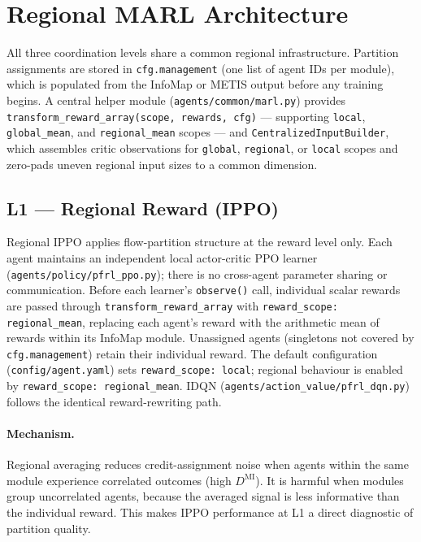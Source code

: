 \documentclass{article}
\begin{document}
\section{Regional MARL Architecture}
\label{app:arch}

All three coordination levels share a common regional infrastructure.
Partition assignments are stored in \texttt{cfg.management} (one list of
agent IDs per module), which is populated from the InfoMap or METIS output
before any training begins.
A central helper module (\texttt{agents/common/marl.py}) provides
\texttt{transform\_reward\_array(scope, rewards, cfg)} --- supporting
\texttt{local}, \texttt{global\_mean}, and \texttt{regional\_mean} scopes ---
and \texttt{CentralizedInputBuilder}, which assembles critic observations for
\texttt{global}, \texttt{regional}, or \texttt{local} scopes and zero-pads
uneven regional input sizes to a common dimension.

\subsection{L1 --- Regional Reward (IPPO)}
\label{app:arch:ippo}

Regional IPPO applies flow-partition structure at the reward level only.
Each agent maintains an independent local actor-critic PPO learner
(\texttt{agents/policy/pfrl\_ppo.py}); there is no cross-agent parameter
sharing or communication.
Before each learner's \texttt{observe()} call, individual scalar rewards
are passed through \texttt{transform\_reward\_array} with
\texttt{reward\_scope: regional\_mean}, replacing each agent's reward with
the arithmetic mean of rewards within its InfoMap module.
Unassigned agents (singletons not covered by \texttt{cfg.management}) retain
their individual reward.
The default configuration (\texttt{config/agent.yaml}) sets
\texttt{reward\_scope: local}; regional behaviour is enabled by
\texttt{reward\_scope: regional\_mean}.
IDQN (\texttt{agents/action\_value/pfrl\_dqn.py}) follows the identical
reward-rewriting path.

\paragraph{Mechanism.}
Regional averaging reduces credit-assignment noise when agents within the
same module experience correlated outcomes (high $D^{\mathrm{MI}}$).
It is harmful when modules group uncorrelated agents, because the averaged
signal is less informative than the individual reward.
This makes IPPO performance at L1 a direct diagnostic of partition quality.
\end{document}
